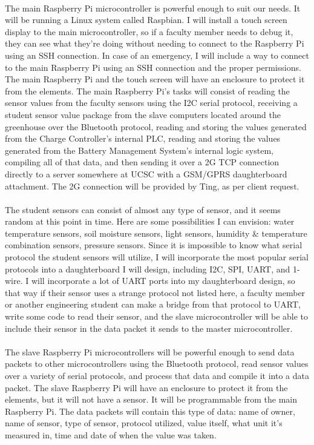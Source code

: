 \paragraph{}
The main Raspberry Pi microcontroller is powerful enough to suit our needs. It will be running a Linux system called Raspbian. I will install a touch screen display to the main microcontroller, so if a faculty member needs to debug it, they can see what they’re doing without needing to connect to the Raspberry Pi using an SSH connection. In case of an emergency, I will include a way to connect to the main Raspberry Pi using an SSH connection and the proper permissions. The main Raspberry Pi and the touch screen will have an enclosure to protect it from the elements. The main Raspberry Pi’s tasks will consist of reading the sensor values from the faculty sensors using the I2C serial protocol, receiving a student sensor value package from the slave computers located around the greenhouse over the Bluetooth protocol, reading and storing the values generated from the Charge Controller’s internal PLC, reading and storing the values generated from the Battery Management System’s internal logic system, compiling all of that data, and then sending it over a 2G TCP connection directly to a server somewhere at UCSC with a GSM/GPRS daughterboard attachment. The 2G connection will be provided by Ting, as per client request.
\paragraph{}
The student sensors can consist of almost any type of sensor, and it seems random at this point in time. Here are some possibilities I can envision: water temperature sensors, soil moisture sensors, light sensors, humidity \& temperature combination sensors, pressure sensors. Since it is impossible to know what serial protocol the student sensors will utilize, I will incorporate the most popular serial protocols into a daughterboard I will design, including I2C, SPI, UART, and 1-wire. I will incorporate a lot of UART ports into my daughterboard design, so that way if their sensor uses a strange protocol not listed here, a faculty member or another engineering student can make a bridge from that protocol to UART, write some code to read their sensor, and the slave microcontroller will be able to include their sensor in the data packet it sends to the master microcontroller.
\paragraph{}
The slave Raspberry Pi microcontrollers will be powerful enough to send data packets to other microcontrollers using the Bluetooth protocol, read sensor values over a variety of serial protocols, and process that data and compile it into a data packet. The slave Raspberry Pi will have an enclosure to protect it from the elements, but it will not have a sensor. It will be programmable from the main Raspberry Pi. The data packets will contain this type of data: name of owner, name of sensor, type of sensor, protocol utilized, value itself, what unit it’s measured in, time and date of when the value was taken.
